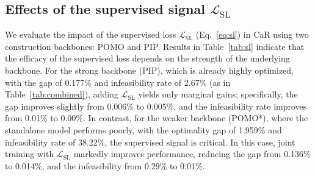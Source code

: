 \documentclass{article} %
\begin{document}
\subsection{{Effects of the supervised signal \texorpdfstring{$\mathcal{L}_{\text{SL}}$}{L\_SL}}}
{We evaluate the impact of the supervised loss $\mathcal{L}_{\text{SL}}$ (Eq.~\ref{eq:sl}) in CaR using two construction backbones: POMO and PIP. Results in Table~\ref{tab:sl} indicate that the efficacy of the supervised loss depends on the strength of the underlying backbone. For the strong backbone (PIP), which is already highly optimized, with the gap of 0.177\% and infeasibility rate of 2.67\% (as in Table~\ref{tab:combined}), adding $\mathcal{L}_{\text{SL}}$ yields only marginal gains; specifically, the gap improves slightly from 0.006\% to 0.005\%, and the infeasibility rate improves from 0.01\% to 0.00\%. In contrast, for the weaker backbone (POMO*), where the standalone model performs poorly, with the optimality gap of 1.959\% and infeasibility rate of 38.22\%, the supervised signal is critical. In this case, joint training with $\mathcal{L}_{\text{SL}}$ markedly improves performance, reducing the gap from 0.136\% to 0.014\%, and the infeasibility from 0.29\% to 0.01\%.}


\begin{table}[t]
    \centering
    \begin{minipage}{0.36\textwidth}
        \centering
        \caption{{Effects of $\mathcal{L}_{\text{SL}}$.}}
        \label{tab:sl}
        {
        }
    \end{minipage}
    \hfill
    \begin{minipage}{0.62\textwidth}
        \centering
        
    \end{minipage}
\end{table}
\end{document}

